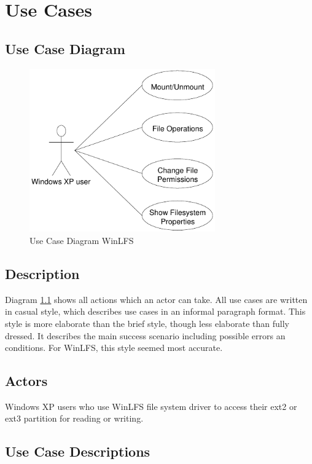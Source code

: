 \chapter{Use Cases}
\label{cha:useCases}

\section{Use Case Diagram}
\begin{figure}[H]
\begin{center}
\includegraphics[width=8cm]{./files/inc/pic/useCaseDiagr}
\end{center}
\caption{\label{fig:useCaseDiagr}Use Case Diagram WinLFS}
\end{figure}

\section{Description}
Diagram \ref{fig:useCaseDiagr} shows all actions which an actor can take. All use cases are written in casual style, which describes use cases in an informal paragraph format. This style is more elaborate than the brief style, though less elaborate than fully dressed. It describes the main success scenario including possible errors an conditions. For WinLFS, this style seemed most accurate.

\section{Actors}
Windows XP users who use WinLFS file system driver to access their ext2 or ext3 partition for reading or writing.

\section{Use Case Descriptions}

